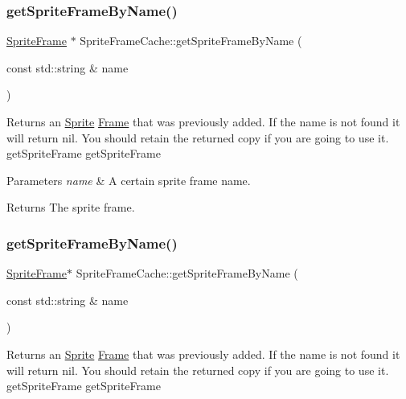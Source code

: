 \subsubsection{\texorpdfstring{get\+Sprite\+Frame\+By\+Name()}{getSpriteFrameByName()}\hspace{0.1cm}{\footnotesize\ttfamily [1/2]}}
{\footnotesize\ttfamily \hyperlink{classSpriteFrame}{Sprite\+Frame} $\ast$ Sprite\+Frame\+Cache\+::get\+Sprite\+Frame\+By\+Name (\begin{DoxyParamCaption}\item[{const std\+::string \&}]{name }\end{DoxyParamCaption})}

Returns an \hyperlink{classSprite}{Sprite} \hyperlink{classFrame}{Frame} that was previously added. If the name is not found it will return nil. You should retain the returned copy if you are going to use it.  get\+Sprite\+Frame  get\+Sprite\+Frame


\begin{DoxyParams}{Parameters}
{\em name} & A certain sprite frame name. \\
\hline
\end{DoxyParams}
\begin{DoxyReturn}{Returns}
The sprite frame. 
\end{DoxyReturn}
\mbox{\label{classSpriteFrameCache_a4a57d65bae4061e8d559c0fb7150e15c}} 
\subsubsection{\texorpdfstring{get\+Sprite\+Frame\+By\+Name()}{getSpriteFrameByName()}\hspace{0.1cm}{\footnotesize\ttfamily [2/2]}}
{\footnotesize\ttfamily \hyperlink{classSpriteFrame}{Sprite\+Frame}$\ast$ Sprite\+Frame\+Cache\+::get\+Sprite\+Frame\+By\+Name (\begin{DoxyParamCaption}\item[{const std\+::string \&}]{name }\end{DoxyParamCaption})}

Returns an \hyperlink{classSprite}{Sprite} \hyperlink{classFrame}{Frame} that was previously added. If the name is not found it will return nil. You should retain the returned copy if you are going to use it.  get\+Sprite\+Frame  get\+Sprite\+Frame


